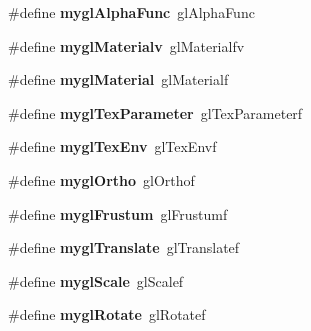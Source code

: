 \begin{DoxyCompactItemize}
\item 
\hypertarget{group___a_p_i___o_g_l_e_s_ga93532ddfaafdea2a43a29347ca8de2ba}{\#define {\bfseries mygl\+Alpha\+Func}~gl\+Alpha\+Func}\label{group___a_p_i___o_g_l_e_s_ga93532ddfaafdea2a43a29347ca8de2ba}

\item 
\hypertarget{group___a_p_i___o_g_l_e_s_ga113fd291d184c1a517bc23ab0225ec62}{\#define {\bfseries mygl\+Materialv}~gl\+Materialfv}\label{group___a_p_i___o_g_l_e_s_ga113fd291d184c1a517bc23ab0225ec62}

\item 
\hypertarget{group___a_p_i___o_g_l_e_s_ga5afd2b2564aa55ebe0bfbb9024909624}{\#define {\bfseries mygl\+Material}~gl\+Materialf}\label{group___a_p_i___o_g_l_e_s_ga5afd2b2564aa55ebe0bfbb9024909624}

\item 
\hypertarget{group___a_p_i___o_g_l_e_s_ga30face5721b0172d8840812f12143468}{\#define {\bfseries mygl\+Tex\+Parameter}~gl\+Tex\+Parameterf}\label{group___a_p_i___o_g_l_e_s_ga30face5721b0172d8840812f12143468}

\item 
\hypertarget{group___a_p_i___o_g_l_e_s_gaa80e0b8c22e9df4c8a91006c2d494247}{\#define {\bfseries mygl\+Tex\+Env}~gl\+Tex\+Envf}\label{group___a_p_i___o_g_l_e_s_gaa80e0b8c22e9df4c8a91006c2d494247}

\item 
\hypertarget{group___a_p_i___o_g_l_e_s_ga462c5faca1479434216ee92821ef9978}{\#define {\bfseries mygl\+Ortho}~gl\+Orthof}\label{group___a_p_i___o_g_l_e_s_ga462c5faca1479434216ee92821ef9978}

\item 
\hypertarget{group___a_p_i___o_g_l_e_s_ga05070fccc9e6b82e91bc7ab064fb402d}{\#define {\bfseries mygl\+Frustum}~gl\+Frustumf}\label{group___a_p_i___o_g_l_e_s_ga05070fccc9e6b82e91bc7ab064fb402d}

\item 
\hypertarget{group___a_p_i___o_g_l_e_s_ga06672f5eb50ea70c2edbccad6b4c9e22}{\#define {\bfseries mygl\+Translate}~gl\+Translatef}\label{group___a_p_i___o_g_l_e_s_ga06672f5eb50ea70c2edbccad6b4c9e22}

\item 
\hypertarget{group___a_p_i___o_g_l_e_s_ga55295ffd66f9915cd32ab8428c1ef07c}{\#define {\bfseries mygl\+Scale}~gl\+Scalef}\label{group___a_p_i___o_g_l_e_s_ga55295ffd66f9915cd32ab8428c1ef07c}

\item 
\hypertarget{group___a_p_i___o_g_l_e_s_gae832a76b223f9698fd976a8036e4e967}{\#define {\bfseries mygl\+Rotate}~gl\+Rotatef}\label{group___a_p_i___o_g_l_e_s_gae832a76b223f9698fd976a8036e4e967}


\end{DoxyCompactItemize}
